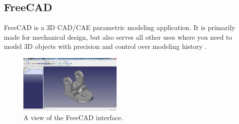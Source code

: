 \subsection{FreeCAD}
FreeCAD is a 3D CAD/CAE parametric modeling application. It is primarily made for mechanical design, but also serves all other uses where you need to model 3D objects with precision and control over modeling history \cite{freecad}.

 \begin{figure}[!h]
\begin{center}
\includegraphics[width=2in]{figures02/freecad.jpg}
\caption{A view of the FreeCAD interface.}
\end{center}
\end{figure}